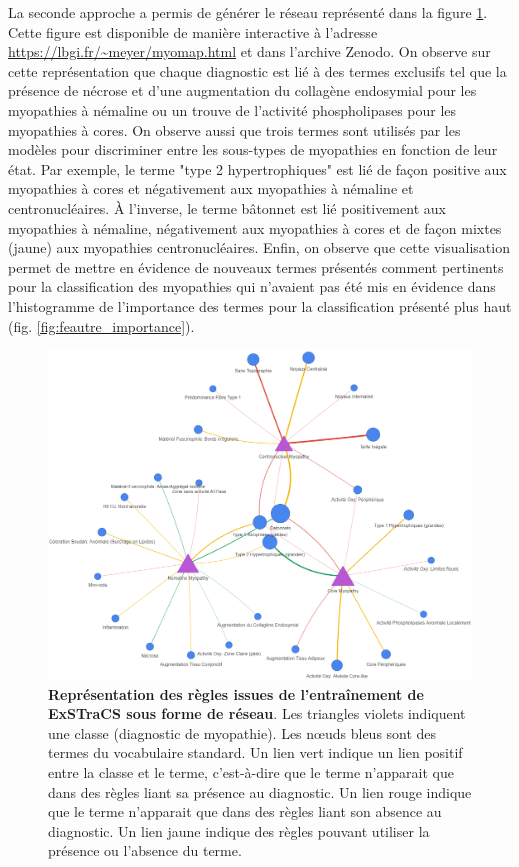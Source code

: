 La seconde approche a permis de générer le réseau représenté dans la figure \ref{fig:network}. Cette figure est disponible de manière interactive à l'adresse \url{https://lbgi.fr/~meyer/myomap.html} et dans l'archive Zenodo. On observe sur cette représentation que chaque diagnostic est lié à des termes exclusifs tel que la présence de nécrose et d'une augmentation du collagène endosymial pour les myopathies à némaline ou un trouve de l'activité phospholipases pour les myopathies à cores. On observe aussi que trois termes sont utilisés par les modèles pour discriminer entre les sous-types de myopathies en fonction de leur état. Par exemple, le terme "type 2 hypertrophiques" est lié de façon positive aux myopathies à cores et négativement aux myopathies à némaline et centronucléaires. À l'inverse, le terme bâtonnet est lié positivement aux myopathies à némaline, négativement aux myopathies à cores et de façon mixtes (jaune) aux myopathies centronucléaires. Enfin, on observe que cette visualisation permet de mettre en évidence de nouveaux termes présentés comment pertinents pour la classification des myopathies qui n'avaient pas été mis en évidence dans l'histogramme de l'importance des termes pour la classification présenté plus haut (fig. \ref{fig:feautre_importance}).
\begin{figure}[H]
  \centering
  \includegraphics[width=1\textwidth]{figures/network_lcs.png}
  \caption[Représentation des règles issues de l'entraînement de ExSTraCS sous forme de réseau]{\textbf{Représentation des règles issues de l'entraînement de ExSTraCS sous forme de réseau}. Les triangles violets indiquent une classe (diagnostic de myopathie). Les nœuds bleus sont des termes du vocabulaire standard. Un lien vert indique un lien positif entre la classe et le terme, c'est-à-dire que le terme n'apparait que dans des règles liant sa présence au diagnostic. Un lien rouge indique que le terme n'apparait que dans des règles liant son absence au diagnostic. Un lien jaune indique des règles pouvant utiliser la présence ou l'absence du terme.}
  \label{fig:network}
\end{figure}

